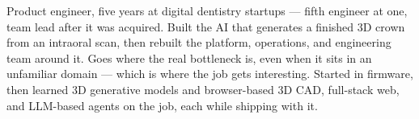 

\begin{cvparagraph}

Product engineer, five years at digital dentistry startups — fifth engineer at one, team lead after it was acquired. Built the AI that generates a finished 3D crown from an intraoral scan, then rebuilt the platform, operations, and engineering team around it. Goes where the real bottleneck is, even when it sits in an unfamiliar domain — which is where the job gets interesting. Started in firmware, then learned 3D generative models and browser-based 3D CAD, full-stack web, and LLM-based agents on the job, each while shipping with it.
\end{cvparagraph}
